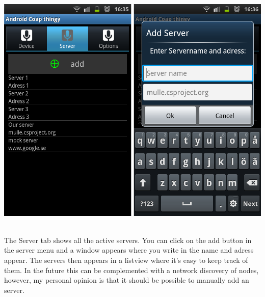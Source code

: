 \begin{center}
 \includegraphics[scale=0.25]{android-server.png}%
\end{center}
 \\The Server tab shows all the active servers. You can click on the add button in the server menu and a window appears where you write in the name and adress appear. The servers then appears in a listview where it's easy to keep track of them. In the future this can be complemented with a network discovery of nodes, however, my personal opinion is that it should be possible to manually add an server.

